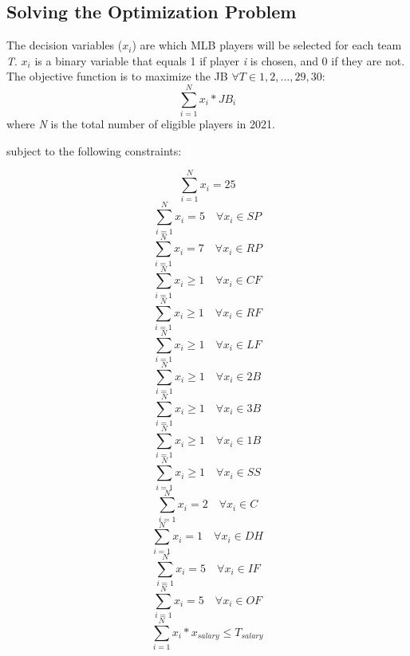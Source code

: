 \documentclass{article}
\begin{document}
\subsection{Solving the Optimization Problem}

The decision variables ($x_{i}$) are which MLB players will be selected for each team \emph{T}. $x_{i}$ is a binary variable that equals 1 if player \emph{i} is chosen, and 0 if they are not. The objective function is to maximize the JB $\forall T \in {1, 2, ..., 29, 30}$:
\begin{equation}
\sum_{i = 1}^{N} x_{i} * JB_{i}
\end{equation} where \emph{N} is the total number of eligible players in 2021.

subject to the following constraints:

\begin{equation}
\sum_{i = 1}^{N} x_{i} = 25
\end{equation}
\begin{equation}
\sum_{i = 1}^{N} x_{i} = 5 \quad \forall x_i \in SP
\end{equation}
\begin{equation}
\sum_{i = 1}^{N} x_{i} = 7 \quad \forall x_i \in RP
\end{equation}
\begin{equation} 
\sum_{i = 1}^{N} x_{i} \geq 1 \quad \forall x_i \in CF
\end{equation}
\begin{equation} 
\sum_{i = 1}^{N} x_{i} \geq 1 \quad \forall x_i \in RF
\end{equation}
\begin{equation} 
\sum_{i = 1}^{N} x_{i} \geq 1 \quad \forall x_i \in LF
\end{equation}
\begin{equation} 
\sum_{i = 1}^{N} x_{i} \geq 1 \quad \forall x_i \in 2B
\end{equation}
\begin{equation} 
\sum_{i = 1}^{N} x_{i} \geq 1 \quad \forall x_i \in 3B
\end{equation} 
\begin{equation} 
\sum_{i = 1}^{N} x_{i} \geq 1 \quad \forall x_i \in 1B
\end{equation}
\begin{equation} 
\sum_{i = 1}^{N} x_{i} \geq 1 \quad \forall x_i \in SS
\end{equation}
\begin{equation} 
\sum_{i = 1}^{N} x_{i} = 2 \quad \forall x_i \in C
\end{equation}
\begin{equation}
\sum_{i = 1}^{N} x_{i} = 1 \quad \forall x_i \in DH
\end{equation}
\begin{equation} 
\sum_{i = 1}^{N} x_{i} = 5 \quad \forall x_i \in IF
\end{equation}
\begin{equation} 
\sum_{i = 1}^{N} x_{i}  = 5 \quad \forall x_i \in OF 
\end{equation}
\begin{equation}
\sum_{i = 1}^{N} x_{i} * x_{salary} \leq T_{salary}
\end{equation}
\end{document}
